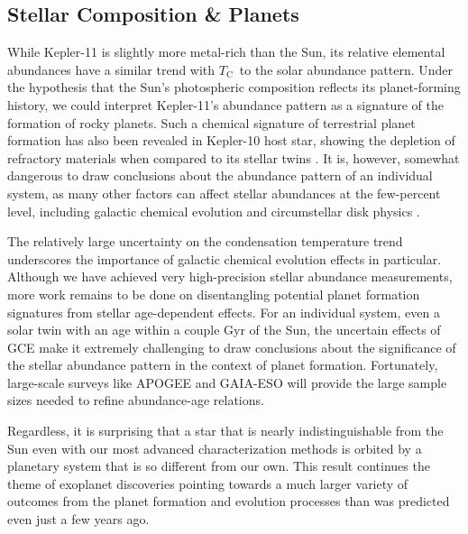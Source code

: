 \documentclass[twocolumn,trackchanges]{aastex61}
\newcommand{\tc}{$T_\mathrm{C}$}
\begin{document}
\subsection{Stellar Composition \& Planets}

While Kepler-11 is slightly more metal-rich than the Sun, its relative elemental abundances have a similar trend with \tc\ to the solar abundance pattern. Under the \citet{Melendez2009} hypothesis that the Sun's photospheric composition reflects its planet-forming history, we could interpret Kepler-11's abundance pattern as a signature of the formation of rocky planets. Such a chemical signature of terrestrial planet formation has also been revealed in Kepler-10 host star, showing the depletion of refractory materials when compared to its stellar twins \citep{Liu2016}. It is, however, somewhat dangerous to draw conclusions about the abundance pattern of an individual system, as many other factors can affect stellar abundances at the few-percent level, including galactic chemical evolution and circumstellar disk physics \citep{Gaidos2015}.

The relatively large uncertainty on the condensation temperature trend underscores the importance of galactic chemical evolution effects in particular. Although we have achieved very high-precision stellar abundance measurements, more work remains to be done on disentangling potential planet formation signatures from stellar age-dependent effects. For an individual system, even a solar twin with an age within a couple Gyr of the Sun, the uncertain effects of GCE make it extremely challenging to draw conclusions about the significance of the stellar abundance pattern in the context of planet formation. Fortunately, large-scale surveys like APOGEE and GAIA-ESO will provide the large sample sizes needed to refine  abundance-age relations.

Regardless, it is surprising that a star that is nearly indistinguishable from the Sun even with our most advanced characterization methods is orbited by a planetary system that is so different from our own. This result continues the theme of exoplanet discoveries pointing towards a much larger variety of outcomes from the planet formation and evolution processes than was predicted even just a few years ago.
\end{document}
